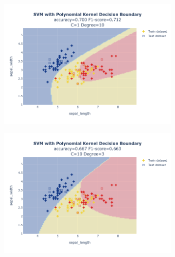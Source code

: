 \documentclass{article}
\begin{document}
\begin{figure}
\begin{subfigure}{0.3\textwidth}
        \includegraphics[scale=.13]{images/implementation/q1/polynomial_kernel/sepal_length_sepal_width_1_10.png}
    \end{subfigure}
    \newline
    \begin{subfigure}{0.3\textwidth}
        \centering
        \includegraphics[scale=.13]{images/implementation/q1/polynomial_kernel/sepal_length_sepal_width_10_3.png}
    \end{subfigure}
    \hfill
    \begin{subfigure}{0.3\textwidth}
        \centering

\end{subfigure}
\end{figure}
\end{document}
